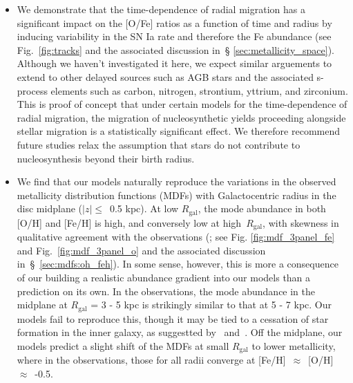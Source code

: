 \documentclass[fleqn, usenatbib]{mnras}
\begin{document}
\begin{itemize}
	\item We demonstrate that the time-dependence of radial migration has a 
	significant impact on the [O/Fe] ratios as a function of time and radius 
	by inducing variability in the SN Ia rate and therefore the Fe abundance 
	(see Fig.~\ref{fig:tracks} and the associated discussion in~\S 
	\ref{sec:metallicity_space}). Although we haven't investigated it here, we 
	expect similar arguements to extend to other delayed sources such as AGB 
	stars and the associated s-process elements such as carbon, nitrogen, 
	strontium, yttrium, and zirconium. This is proof of concept that under 
	certain models for the time-dependence of radial migration, the migration 
	of nucleosynthetic yields proceeding alongside stellar migration is a 
	statistically significant effect. We therefore recommend future studies 
	relax the assumption that stars do not contribute to nucleosynthesis 
	beyond their birth radius. 

	\item We find that our models naturally reproduce the variations in the 
	observed metallicity distribution functions (MDFs) with Galactocentric 
	radius in the disc midplane ($\left|z\right|\leq$~0.5 kpc). At low 
	$R_\text{gal}$, the mode abundance in both [O/H] and [Fe/H] is high, and 
	conversely low at high~$R_\text{gal}$, with skewness in qualitative 
	agreement with the observations (\citealp[e.g.][]{Hayden2015}; see Fig. 
	\ref{fig:mdf_3panel_fe} and Fig.~\ref{fig:mdf_3panel_o} and the associated 
	discussion in~\S~\ref{sec:mdfs:oh_feh}). In some sense, 
	however, this is more a consequence of our building a realistic abundance 
	gradient into our models than a prediction on its own. In the observations, 
	the mode abundance in the midplane at $R_\text{gal}$ = 3 - 5 kpc is 
	strikingly similar to that at 5 - 7 kpc. Our models fail to reproduce this, 
	though it may be tied to a cessation of star formation in the inner 
	galaxy, as suggestted by~\citet{Peek2009} and~\citet{Fraternali2012}. Off 
	the midplane, our models predict a slight shift of the MDFs at small 
	$R_\text{gal}$ to lower metallicity, where in the observations, those for 
	all radii converge at [Fe/H]~$\approx$~[O/H]~$\approx$~-0.5. 


\end{itemize}
\end{document}
